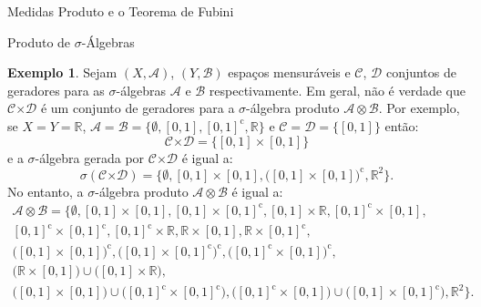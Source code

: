 \documentclass[oneside,final,11pt]{amsbook}
\newcommand{\R}{\mathds R}
\newcommand{\Times}{\pmb{\times}}
\newcommand{\compl}{\mathrm c}
\theoremstyle{remark}\newtheorem{exercise}{Exercício}[chapter]
\theoremstyle{remark}\newtheorem{*exercise}[exercise]{\hbox to 0pt{\hskip 0pt minus 1fil*}Exercício}
\theoremstyle{definition}\newtheorem{exdefin}{Definição}[chapter]
\theoremstyle{plain}\newtheorem{teo}{Teorema}[section]
\theoremstyle{plain}\newtheorem{lem}[teo]{Lema}
\theoremstyle{plain}\newtheorem{prop}[teo]{Proposição}
\theoremstyle{plain}\newtheorem{cor}[teo]{Corolário}
\theoremstyle{definition}\newtheorem{defin}[teo]{Definição}
\theoremstyle{remark}\newtheorem{rem}[teo]{Observação}
\theoremstyle{definition}\newtheorem{notation}[teo]{Notação}
\theoremstyle{definition}\newtheorem{convention}[teo]{Convenção}
\theoremstyle{definition}\newtheorem{example}[teo]{Exemplo}
\numberwithin{section}{chapter}
\numberwithin{equation}{section}
\begin{document}
\begin{chapter}{Medidas Produto e o Teorema de Fubini}
\begin{section}{Produto de ${\sigma}$-Álgebras}
\begin{example}\label{exa:prodnaogera}
Sejam $(X,\mathcal A)$, $(Y,\mathcal B)$ espaços mensuráveis e $\mathcal C$, $\mathcal D$
conjuntos de geradores para as $\sigma$-álgebras $\mathcal A$ e $\mathcal B$ respectivamente. Em geral,
não é verdade que $\mathcal C\Times\mathcal D$ é um conjunto de geradores para
a $\sigma$-álgebra produto $\mathcal A\otimes\mathcal B$. Por exemplo, se $X=Y=\R$,
$\mathcal A=\mathcal B=\big\{\emptyset,[0,1],[0,1]^\compl,\R\big\}$ e $\mathcal C=\mathcal D=\big\{[0,1]\big\}$
então:
\[\mathcal C\Times\mathcal D=\big\{[0,1]\times[0,1]\big\}\]
e a $\sigma$-álgebra gerada por $\mathcal C\Times\mathcal D$ é igual a:
\[\sigma(\mathcal C\Times\mathcal D)=\big\{\emptyset,[0,1]\times[0,1],
\big([0,1]\times[0,1]\big)^\compl,\R^2\big\}.\]
No entanto, a $\sigma$-álgebra produto $\mathcal A\otimes\mathcal B$ é igual a:
\begin{multline*}
\mathcal A\otimes\mathcal B=\big\{\emptyset,[0,1]\times[0,1],[0,1]\times[0,1]^\compl,
[0,1]\times\R,[0,1]^\compl\times[0,1],\\
[0,1]^\compl\times[0,1]^\compl,[0,1]^\compl\times\R,\R\times[0,1],\R\times[0,1]^\compl,\\
\big([0,1]\times[0,1]\big)^\compl,\big([0,1]\times[0,1]^\compl\big)^\compl,
\big([0,1]^\compl\times[0,1]\big)^\compl,\\
\big(\R\times[0,1]\big)\cup\big([0,1]\times\R\big),\\
\big([0,1]\times[0,1]\big)\cup\big([0,1]^\compl\times[0,1]^\compl\big),
\big([0,1]^\compl\times[0,1]\big)\cup\big([0,1]\times[0,1]^\compl\big),\R^2\big\}.
\end{multline*}
\end{example}


\end{section}
\end{chapter}
\end{document}
